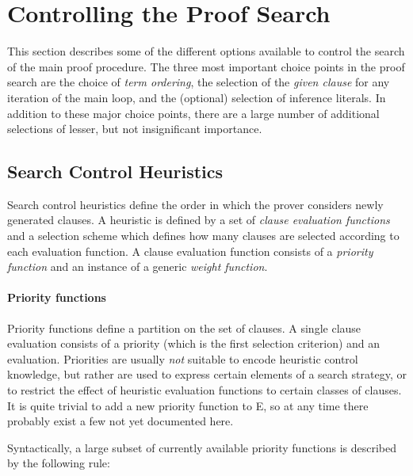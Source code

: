\documentclass{report}
\begin{document}
\chapter{Controlling the Proof Search}
\label{sec:options}

This section describes some of the different options available to
control the search of the main proof procedure. The three most
important choice points in the proof search are the choice of
\emph{term ordering}, the selection of the
\emph{given clause} for any iteration of the main
loop, and the (optional) selection of inference
literals. In addition to these major choice
points, there are a large number of additional selections of lesser,
but not insignificant importance.


\section{Search Control Heuristics}
\label{sec:options:heuristics}

Search control heuristics define the order in which the prover
considers newly generated clauses. A heuristic is defined by a set of
\emph{clause evaluation functions} and a selection scheme which defines
how many clauses are selected according to each evaluation function. A
clause evaluation function consists of a \emph{priority function} and
an instance of a generic \emph{weight function}.

\subsubsection{Priority functions}

Priority functions define a partition on the set of clauses.  A single
clause evaluation consists of a priority (which is the first selection
criterion) and an evaluation. Priorities are usually \emph{not}
suitable to encode heuristic control knowledge, but rather are used to
express certain elements of a search strategy, or to restrict the
effect of heuristic evaluation functions to certain classes of
clauses. It is quite trivial to add a new priority function to E, so
at any time there probably exist a few not yet documented here.

Syntactically, a large subset of currently available priority
functions is described by the following rule:
\end{document}
